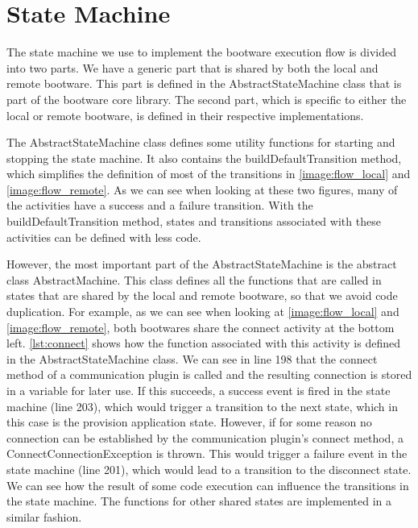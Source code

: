 \section{State Machine}
\label{implementation:statemachine}

The state machine we use to implement the bootware execution flow is divided into two parts.
We have a generic part that is shared by both the local and remote bootware.
This part is defined in the AbstractStateMachine class that is part of the bootware core library.
The second part, which is specific to either the local or remote bootware, is defined in their respective implementations.

The AbstractStateMachine class defines some utility functions for starting and stopping the state machine.
It also contains the buildDefaultTransition method, which simplifies the definition of most of the transitions in \autoref{image:flow_local} and \autoref{image:flow_remote}.
As we can see when looking at these two figures, many of the activities have a success and a failure transition.
With the buildDefaultTransition method, states and transitions associated with these activities can be defined with less code.

However, the most important part of the AbstractStateMachine is the abstract class AbstractMachine.
This class defines all the functions that are called in states that are shared by the local and remote bootware, so that we avoid code duplication.
For example, as we can see when looking at \autoref{image:flow_local} and \autoref{image:flow_remote}, both bootwares share the connect activity at the bottom left.
\autoref{lst:connect} shows how the function associated with this activity is defined in the AbstractStateMachine class.
We can see in line 198 that the connect method of a communication plugin is called and the resulting connection is stored in a variable for later use.
If this succeeds, a success event is fired in the state machine (line 203), which would trigger a transition to the next state, which in this case is the provision application state.
However, if for some reason no connection can be established by the communication plugin's connect method, a ConnectConnectionException is thrown.
This would trigger a failure event in the state machine (line 201), which would lead to a transition to the disconnect state.
We can see how the result of some code execution can influence the transitions in the state machine.
The functions for other shared states are implemented in a similar fashion.

